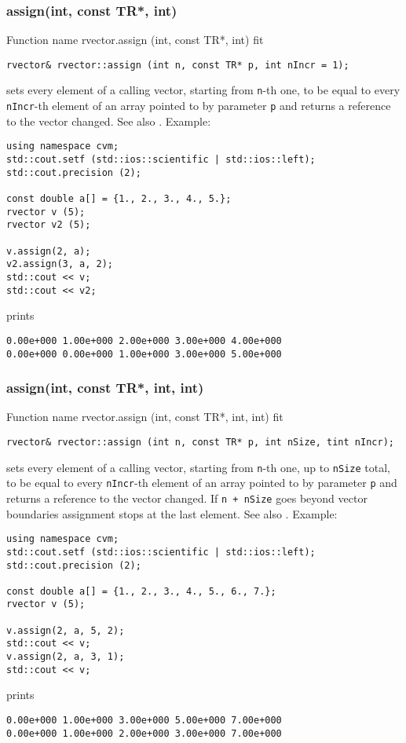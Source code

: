 \subsubsection{assign(int, const TR*, int)}
Function%
\pdfdest name {rvector.assign (int, const TR*, int)} fit
\begin{verbatim}
rvector& rvector::assign (int n, const TR* p, int nIncr = 1);
\end{verbatim}
sets every element of a calling vector, starting from \Based \verb"n"-th one,
to be equal to
every \verb"nIncr"-th element of an array  pointed to by parameter \verb"p"
and returns a reference to the vector changed.
See also .
Example:
\begin{Verbatim}
using namespace cvm;
std::cout.setf (std::ios::scientific | std::ios::left);
std::cout.precision (2);

const double a[] = {1., 2., 3., 4., 5.};
rvector v (5);
rvector v2 (5);

v.assign(2, a);
v2.assign(3, a, 2);
std::cout << v;
std::cout << v2;
\end{Verbatim}
prints
\begin{Verbatim}
0.00e+000 1.00e+000 2.00e+000 3.00e+000 4.00e+000
0.00e+000 0.00e+000 1.00e+000 3.00e+000 5.00e+000
\end{Verbatim}
\newpage


\subsubsection{assign(int, const TR*, int, int)}
Function%
\pdfdest name {rvector.assign (int, const TR*, int, int)} fit
\begin{verbatim}
rvector& rvector::assign (int n, const TR* p, int nSize, tint nIncr);
\end{verbatim}
sets every element of a calling vector, starting from \Based \verb"n"-th one,
up to \verb"nSize" total,
to be equal to
every \verb"nIncr"-th element of an array  pointed to by parameter \verb"p"
and returns a reference to the vector changed.
If \verb"n + nSize" goes beyond vector boundaries assignment stops at the last element.
See also .
Example:
\begin{Verbatim}
using namespace cvm;
std::cout.setf (std::ios::scientific | std::ios::left);
std::cout.precision (2);

const double a[] = {1., 2., 3., 4., 5., 6., 7.};
rvector v (5);

v.assign(2, a, 5, 2);
std::cout << v;
v.assign(2, a, 3, 1);
std::cout << v;
\end{Verbatim}
prints
\begin{Verbatim}
0.00e+000 1.00e+000 3.00e+000 5.00e+000 7.00e+000
0.00e+000 1.00e+000 2.00e+000 3.00e+000 7.00e+000
\end{Verbatim}
\newpage






